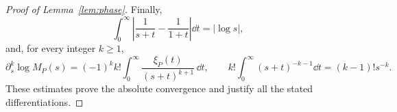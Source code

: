 \begin{proof}[Proof of Lemma~\ref{lem:phase}]
Finally,
\[
  \int_0^\infty
   \left|\frac1{s+t}-\frac1{1+t}\right|\dd t=|\log s|,
\]
and, for every integer \(k\ge1\),
\[
  \partial_s^k\log M_P(s)
  =(-1)^k k!\int_0^\infty
                    \frac{\xi_P(t)}{(s+t)^{k+1}}\,\dd t,
  \qquad
  k!\int_0^\infty(s+t)^{-k-1}\dd t
       =(k-1)!s^{-k}.
\]
These estimates prove the absolute convergence and justify all the stated differentiations.
\end{proof}
